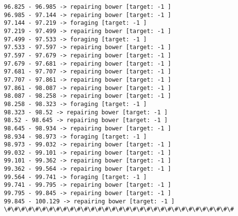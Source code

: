 \documentclass[11pt]{article}
\begin{document}
\begin{Verbatim}[commandchars=\\\{\}]
96.825 - 96.985 -> repairing bower [target: -1 ]
96.985 - 97.144 -> repairing bower [target: -1 ]
97.144 - 97.219 -> foraging [target: -1 ]
97.219 - 97.499 -> repairing bower [target: -1 ]
97.499 - 97.533 -> foraging [target: -1 ]
97.533 - 97.597 -> repairing bower [target: -1 ]
97.597 - 97.679 -> repairing bower [target: -1 ]
97.679 - 97.681 -> repairing bower [target: -1 ]
97.681 - 97.707 -> repairing bower [target: -1 ]
97.707 - 97.861 -> repairing bower [target: -1 ]
97.861 - 98.087 -> repairing bower [target: -1 ]
98.087 - 98.258 -> repairing bower [target: -1 ]
98.258 - 98.323 -> foraging [target: -1 ]
98.323 - 98.52 -> repairing bower [target: -1 ]
98.52 - 98.645 -> repairing bower [target: -1 ]
98.645 - 98.934 -> repairing bower [target: -1 ]
98.934 - 98.973 -> foraging [target: -1 ]
98.973 - 99.032 -> repairing bower [target: -1 ]
99.032 - 99.101 -> repairing bower [target: -1 ]
99.101 - 99.362 -> repairing bower [target: -1 ]
99.362 - 99.564 -> repairing bower [target: -1 ]
99.564 - 99.741 -> foraging [target: -1 ]
99.741 - 99.795 -> repairing bower [target: -1 ]
99.795 - 99.845 -> repairing bower [target: -1 ]
99.845 - 100.129 -> repairing bower [target: -1 ]
\#\#\#\#\#\#\#\#\#\#\#\#\#\#\#\#\#\#\#\#\#\#\#\#\#\#\#\#\#\#\#\#\#



\end{Verbatim}
\end{document}
